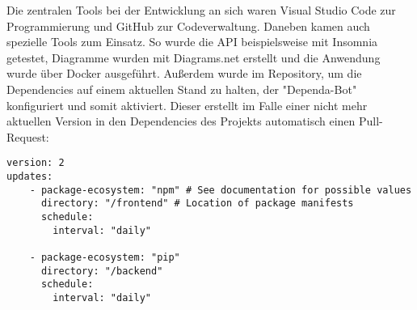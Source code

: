 Die zentralen Tools bei der Entwicklung an sich waren Visual Studio Code zur Programmierung und GitHub zur Codeverwaltung. Daneben kamen auch spezielle Tools zum Einsatz. So wurde die API beispielsweise mit Insomnia \cite{insomnia} getestet, Diagramme wurden mit Diagrams.net \cite{diagrams.net} erstellt und die Anwendung wurde über Docker ausgeführt. Außerdem wurde im Repository, um die Dependencies auf einem aktuellen Stand zu halten, der "Dependa-Bot" konfiguriert und somit aktiviert. Dieser erstellt im Falle einer nicht mehr aktuellen Version in den Dependencies des Projekts automatisch einen Pull-Request:

\begin{lstlisting}
version: 2
updates:
	- package-ecosystem: "npm" # See documentation for possible values
	  directory: "/frontend" # Location of package manifests
	  schedule:
		interval: "daily"
	
	- package-ecosystem: "pip"
	  directory: "/backend"
	  schedule:
		interval: "daily"
\end{lstlisting}


